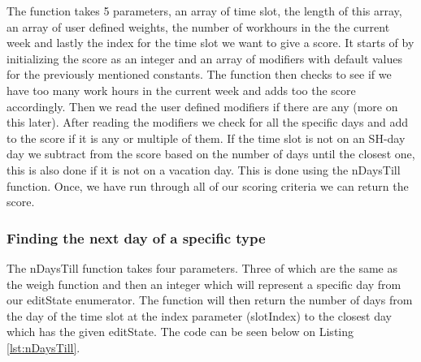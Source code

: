 The function takes 5 parameters, an array of time slot, the length of this array, an array of user defined weights, the number of workhours in the the current week and lastly the index for the time slot we want to give a score. It starts of by initializing the score as an integer and an array of modifiers with default values for the previously mentioned constants. The function then checks to see if we have too many work hours in the current week and adds too the score accordingly. Then we read the user defined modifiers if there are any (more on this later). After reading the modifiers we check for all the specific days and add to the score if it is any or multiple of them. If the time slot is not on an SH-day day we subtract from the score based on the number of days until the closest one, this is also done if it is not on a vacation day. This is done using the nDaysTill function. Once, we have run through all of our scoring criteria we can return the score.

\subsubsection{Finding the next day of a specific type}
The nDaysTill function takes four parameters. Three of which are the same as the weigh function and then an integer which will represent a specific day from our editState enumerator. The function will then return the number of days from the day of the time slot at the index parameter (slotIndex) to the closest day which has the given editState. The code can be seen below on Listing \ref{lst:nDaysTill}.

